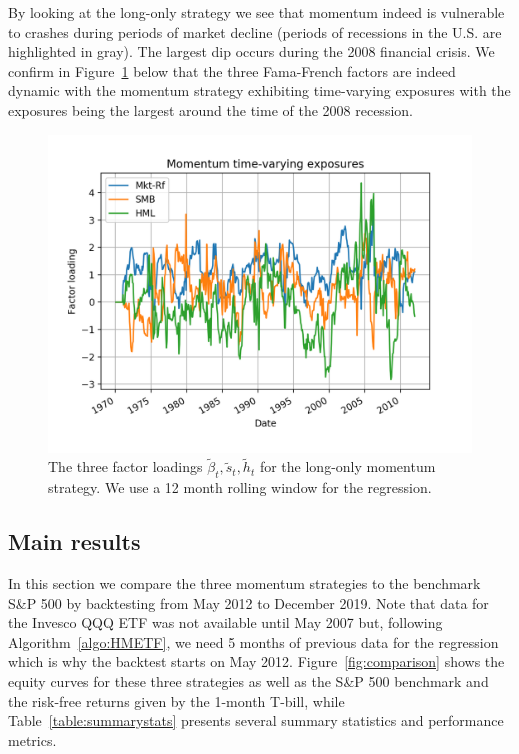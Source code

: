 \documentclass[10pt, letterpaper]{article}
\begin{document}
By looking at the long-only strategy we see that momentum indeed is vulnerable to crashes during periods of market decline (periods of recessions in the U.S. are highlighted in gray).  The largest dip occurs during the 2008 financial crisis.  We confirm in Figure~\ref{fig:timevarying} below that the three Fama-French factors are indeed dynamic with the momentum strategy exhibiting time-varying exposures with the exposures being the largest around the time of the 2008 recession. 

\begin{figure}[H]
\centering
\includegraphics[width=\textwidth]{timevarying.png}
\caption{The three factor loadings $\tilde{\beta}_t, \tilde{s}_t, \tilde{h}_t$ for the long-only momentum strategy.  We use a 12 month rolling window for the regression.}
\label{fig:timevarying}
\end{figure}




\subsection{Main results}

In this section we compare the three momentum strategies to the benchmark S\&P 500 by backtesting from May 2012 to December 2019.  Note that data for the Invesco QQQ ETF was not available until May 2007 but, following Algorithm~\ref{algo:HMETF}, we need 5 months of previous data for the regression which is why the backtest starts on May 2012.  Figure~\ref{fig:comparison} shows the equity curves for these three strategies as well as the S\&P 500 benchmark and the risk-free returns given by the 1-month T-bill, while Table~\ref{table:summarystats} presents several summary statistics and performance metrics.\\
\end{document}
